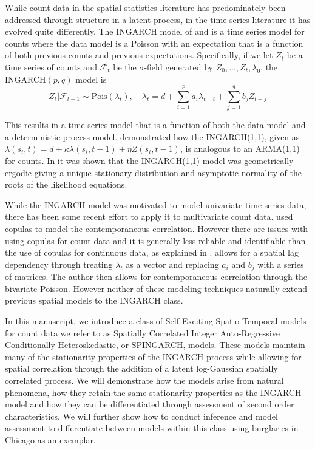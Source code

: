 \documentclass[11pt]{isuthesis}
\begin{document}
While count data in the spatial statistics literature has predominately been addressed through structure in a latent process, in the time series literature it has evolved quite differently.  The INGARCH model of \cite{ferland2006integer} and \cite{heinen2003modelling} is a time series model for counts where the data model is a Poisson with an expectation that is a function of both previous counts and previous expectations.  Specifically, if we let ${Z_t}$ be a time series of counts and $\mathcal{F}_t$ be the $\sigma$-field generated by ${Z_0,...,Z_t,\lambda_0}$, the INGARCH$(p,q)$ model is
\begin{equation}
	Z_t|\mathcal{F}_{t-1}\sim \mbox{Pois}(\lambda_t),\quad \lambda_t=d + \sum_{i=1}^p a_i \lambda_{t-i}+\sum_{j=1}^q b_j Z_{t-j}\label{eq:INGARCH}
\end{equation}

This results in a time series model that is a function of both the data model and a deterministic process model.  \cite{ferland2006integer} demonstrated how the INGARCH(1,1), given as $\lambda(s_i,t)=d+\kappa \lambda(s_i,t-1)+\eta Z(s_i,t-1)$, is analogous to an ARMA(1,1) for counts.  In \cite{fokianos2009poisson} it was shown that the INGARCH(1,1) model was geometrically ergodic giving a unique stationary distribution and asymptotic normality of the roots of the likelihood equations.

While the INGARCH model was motivated to model univariate time series data, there has been some recent effort to apply it to multivariate count data.  \cite{heinen2007multivariate} used copulas to model the contemporaneous correlation.  However there are issues with using copulas for count data and it is generally less reliable and identifiable than the use of copulas for continuous data, as explained in \cite{genest2007primer} .  \cite{liu2012some} allows for a spatial lag dependency through treating $\lambda_t$ as a vector and replacing $a_i$ and $b_j$ with a series of matrices.  The author then allows for contemporaneous correlation through the bivariate Poisson.  However neither of these modeling techniques naturally extend previous spatial models to the INGARCH class.

In this manuscript, we introduce a class of Self-Exciting Spatio-Temporal models for count data we refer to as Spatially Correlated Integer Auto-Regressive Conditionally Heteroskedastic, or SPINGARCH, models.  These models maintain many of the stationarity properties of the INGARCH process while allowing for spatial correlation through the addition of a latent log-Gaussian spatially correlated process.  We will demonstrate how the models arise from natural phenomena, how they retain  the same stationarity properties as the INGARCH model and how they can be differentiated through assessment of second order characteristics.  We will further show how to conduct inference and model assessment to differentiate between models within this class using burglaries in Chicago as an exemplar.
\end{document}

